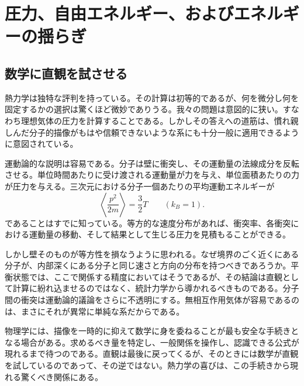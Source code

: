 \chapter{圧力、自由エネルギー、およびエネルギーの揺らぎ}


\section{数学に直観を試させる}

熱力学は独特な評判を持っている。その計算は初等的であるが、何を微分し何を固定するかの選択は驚くほど微妙でありうる。我々の問題は意図的に狭い。すなわち理想気体の圧力を計算することである。しかしその答えへの道筋は、慣れ親しんだ分子的描像がもはや信頼できないような系にも十分一般に適用できるように意図されている。

運動論的な説明は容易である。分子は壁に衝突し、その運動量の法線成分を反転させる。単位時間あたりに受け渡される運動量が力を与え、単位面積あたりの力が圧力を与える。三次元における分子一個あたりの平均運動エネルギーが
\begin{equation}
 \left\langle \frac{p^2}{2m}\right\rangle=\frac{3}{2}T
 \qquad (k_B=1).
 \label{eq:sm5-mean-kinetic-energy}
\end{equation}
であることはすでに知っている。等方的な速度分布があれば、衝突率、各衝突における運動量の移動、そして結果として生じる圧力を見積もることができる。

しかし壁そのものが等方性を損なうように思われる。なぜ境界のごく近くにある分子が、内部深くにある分子と同じ速さと方向の分布を持つべきであろうか。平衡状態では、ここで関係する精度においてはそうであるが、その結論は直観として計算に紛れ込ませるのではなく、統計力学から導かれるべきものである。分子間の衝突は運動論的議論をさらに不透明にする。無相互作用気体が容易であるのは、まさにそれが異常に単純な系だからである。

物理学には、描像を一時的に抑えて数学に身を委ねることが最も安全な手続きとなる場合がある。求めるべき量を特定し、一般関係を操作し、認識できる公式が現れるまで待つのである。直観は最後に戻ってくるが、そのときには数学が直観を試しているのであって、その逆ではない。熱力学の喜びは、この手続きから現れる驚くべき関係にある。

